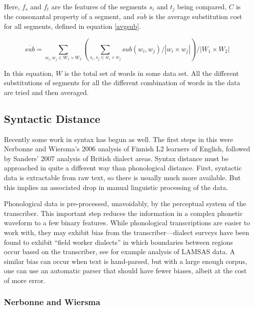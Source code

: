 \documentclass[11pt]{article}
\begin{document}
Here, $f_s$ and $f_t$ are the features of the segments $s_i$ and $t_j$
being compared, $C$ is the consonantal property of a segment, and
$\overline{sub}$ is the average substitution cost for all segments,
defined in equation \ref{avgsub}.

\begin{equation}
\overline{sub} = \sum_{w_i,w_j \in W_1\times W_2}(\sum_{s_i,s_j \in w_i
  \times w_j}sub(w_i,w_j) / |w_i\times w_j|) / |W_1\times W_2|
\label{avgsub}
\end{equation}

In this equation, $W$ is the total set of words in some data set. All
the different substitutions of segments for all the different
combination of words in the data are tried and then averaged.

\subsection{Syntactic  Distance}
Recently some work in syntax has begun as well. The first steps in
this were Nerbonne and Wiersma's 2006 analysis of Finnish L2 learners
of English, followed by Sanders' 2007 analysis of British dialect
areas. Syntax distance must be approached in quite a different way than
phonological distance. First, syntactic data is extractable from raw
text, so there is usually much more available. But this implies an
associated drop in manual linguistic processing of the
data.

Phonological data is pre-processed, unavoidably, by the perceptual
system of the transcriber. This important step reduces the information
in a complex phonetic waveform to a few binary features. While
phonological transcriptions are easier to work with, they may exhibit bias
from the transcriber---dialect surveys have been found to exhibit
``field worker dialects'' in which
boundaries between regions occur based on the transcriber, see for
example  analysis of LAMSAS data. A
similar bias can occur when text is hand-parsed, but with a
large enough corpus, one can use an automatic parser that should have
fewer biases, albeit at the cost of more error.

\subsubsection{Nerbonne and Wiersma}
\label{nerbonne06}
\end{document}
